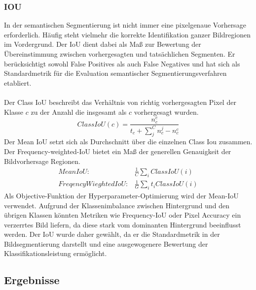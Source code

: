 \documentclass[12pt,DIV=15,BCOR=15mm,twoside,headsepline,abstract=true,listof=totoc,bibliography=totoc]{scrreprt}
\theoremstyle{remark}    %
\begin{document}
    \subsubsection{IOU}
    In der semantischen Segmentierung ist nicht immer eine pixelgenaue Vorhersage erforderlich. Häufig steht vielmehr die korrekte Identifikation ganzer 
    Bildregionen im Vordergrund. Der \ac{IoU} dient dabei als Maß zur Bewertung der Übereinstimmung zwischen vorhergesagten und tatsächlichen Segmenten. 
    Er berücksichtigt sowohl False Positives als auch False Negatives und hat sich als Standardmetrik für die Evaluation semantischer Segmentierungsverfahren 
    etabliert.\\\\ 
    Der Class \ac{IoU} beschreibt das Verhältnis von richtig vorhergesagten Pixel der Klasse $c$ zu der Anzahl die insgesamt als $c$ vorhergesagt wurden.
    \begin{equation}
        Class IoU(c) = \frac{n^c_{c}}{t_c + \sum_{j}^{C} n^j_{c} - n^c_{c}} 
    \end{equation}
    Der Mean \ac{IoU} setzt sich als Durchschnitt über die einzelnen Class Iou zusammen. Der Frequency-weighted-\ac{IoU} bietet ein Maß der generellen Genauigkeit
    der Bildvorhersage Regionen.\cite{csurka2023semanticimagesegmentationdecades}
    \begin{align}
        Mean IoU:& \frac{1}{C} \sum_{i} Class IoU(i)\\
        Freqency Wieghted IoU: & \frac{1}{G} \sum_{i} t_i Class IoU(i)
    \end{align}\noindent
    Als Objective-Funktion der Hyperparameter-Optimierung wird der Mean-\ac{IoU} verwendet. Aufgrund der Klassenimbalance zwischen Hintergrund und den übrigen Klassen 
    könnten Metriken wie Frequency-\ac{IoU} oder Pixel Accuracy ein verzerrtes Bild liefern, da diese stark vom dominanten Hintergrund beeinflusst werden. Der \ac{IoU} wurde 
    daher gewählt, da er die Standardmetrik in der Bildsegmentierung darstellt und eine ausgewogenere Bewertung der Klassifikationsleistung ermöglicht.
    \subsection{Ergebnisse}
\end{document}
